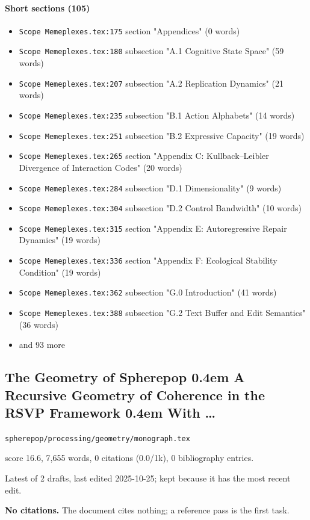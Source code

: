 \documentclass[11pt]{article}
\newcommand{\loc}[1]{{\small\color{muted}\texttt{#1}}}
\begin{document}
\paragraph{Short sections (105)}
\begin{itemize}
\item \loc{Scope Memeplexes.tex:175} section "Appendices" (0 words)
\item \loc{Scope Memeplexes.tex:180} subsection "A.1 Cognitive State Space" (59 words)
\item \loc{Scope Memeplexes.tex:207} subsection "A.2 Replication Dynamics" (21 words)
\item \loc{Scope Memeplexes.tex:235} subsection "B.1 Action Alphabets" (14 words)
\item \loc{Scope Memeplexes.tex:251} subsection "B.2 Expressive Capacity" (19 words)
\item \loc{Scope Memeplexes.tex:265} section "Appendix C: Kullback--Leibler Divergence of Interaction Codes" (20 words)
\item \loc{Scope Memeplexes.tex:284} subsection "D.1 Dimensionality" (9 words)
\item \loc{Scope Memeplexes.tex:304} subsection "D.2 Control Bandwidth" (10 words)
\item \loc{Scope Memeplexes.tex:315} section "Appendix E: Autoregressive Repair Dynamics" (19 words)
\item \loc{Scope Memeplexes.tex:336} section "Appendix F: Ecological Stability Condition" (19 words)
\item \loc{Scope Memeplexes.tex:362} subsection "G.0 Introduction" (41 words)
\item \loc{Scope Memeplexes.tex:388} subsection "G.2 Text Buffer and Edit Semantics" (36 words)
\item[] {\color{muted}\small and 93 more}
\end{itemize}
\subsection{The Geometry of Spherepop 0.4em A Recursive Geometry of Coherence in the RSVP Framework 0.4em With \ldots{}}
\loc{spherepop/\allowbreak{}processing/\allowbreak{}geometry/\allowbreak{}monograph.tex}\par
score 16.6, 7,655 words, 0 citations (0.0/1k), 0 bibliography entries.

Latest of 2 drafts, last edited 2025-10-25; kept because it has the most recent edit.

\textbf{No citations.} The document cites nothing; a reference pass is the first task.
\end{document}
